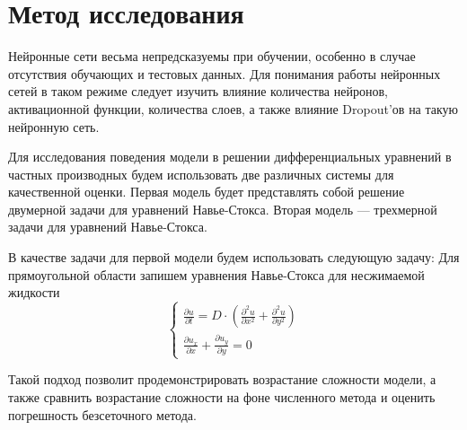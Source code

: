 \chapter{Метод исследования}
Нейронные сети весьма непредсказуемы при обучении, особенно в случае отсутствия
обучающих и тестовых данных. Для понимания работы нейронных сетей в таком режиме
следует изучить влияние количества нейронов, активационной функции, количества слоев, а также
влияние Dropout'ов на такую нейронную сеть.

Для исследования поведения модели в решении дифференциальных уравнений в частных
производных будем использовать две различных системы для качественной оценки.
Первая модель будет представлять собой решение двумерной задачи для уравнений Навье-Стокса.
Вторая модель --- трехмерной задачи для уравнений Навье-Стокса.

В качестве задачи для первой модели будем использовать следующую задачу:
Для прямоугольной области запишем уравнения Навье-Стокса для несжимаемой жидкости
\begin{equation}
	\begin{cases}
		\frac{\partial{u}}{\partial{t}} = D \cdot \left(\frac{\partial^2{u}}{\partial{x^2}} +
		\frac{\partial^2{u}}{\partial{y^2}}\right) \\
		\frac{\partial{u_x}}{\partial{x}} + \frac{\partial{u_y}}{\partial{y}} = 0
	\end{cases}
\end{equation}


Такой подход позволит продемонстрировать возрастание сложности модели, а также сравнить возрастание
сложности на фоне численного метода и оценить погрешность безсеточного метода.
